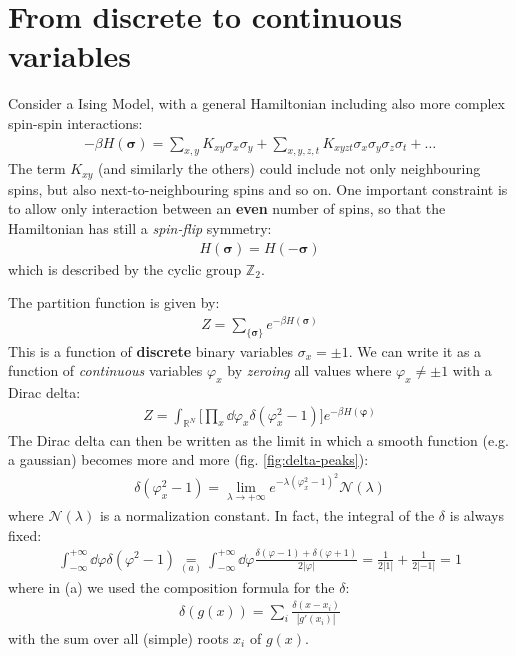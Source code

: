 \documentclass[../../main.tex]{subfiles}
\begin{document}
\section{From discrete to continuous variables}
Consider a Ising Model, with a general Hamiltonian including also more complex spin-spin interactions:
\begin{align}\label{eqn:H-complex}
    -\beta H(\bm{\sigma}) = \sum_{x,y} K_{xy} \sigma_x \sigma_y + \sum_{x,y,z,t} K_{xyzt} \sigma_x \sigma_y \sigma_z \sigma_t + \dots
\end{align}
The term $K_{xy}$ (and similarly the others) could include not only neighbouring spins, but also next-to-neighbouring spins and so on. One important constraint is to allow only interaction between an \textbf{even} number of spins, so that the Hamiltonian has still a \textit{spin-flip} symmetry:
\begin{align*}
    H(\bm{\sigma}) = H(-\bm{\sigma})
\end{align*}  
which is described by the cyclic group $\mathbb{Z}_2$.

\medskip

The partition function is given by:
\begin{align*}
    Z = \sum_{\{\bm{\sigma}\}} e^{-\beta H(\bm{\sigma})}
\end{align*}
This is a function of \textbf{discrete} binary variables $\sigma_x = \pm 1$. We can write it as a function of \textit{continuous} variables $\varphi_x$ by \textit{zeroing} all values where $\varphi_x \neq \pm 1$ with a Dirac delta:
\begin{align}\label{eqn:Z-delta}
    Z = \int_{\mathbb{R}^N} \Big[\prod_x \dd{\varphi_x} \delta(\varphi_x^2- 1)\Big] e^{-\beta H(\bm{\varphi})}
\end{align} 
The Dirac delta can then be written as the limit in which a smooth function (e.g. a gaussian) becomes more and more  (fig. \ref{fig:delta-peaks}):
\begin{align}\label{eqn:delta-limit}
    \delta(\varphi_x^2 - 1) = \lim_{\lambda \to +\infty} e^{- \lambda (\varphi_x^2 - 1)^2} \mathcal{N}(\lambda)
\end{align}
where $\mathcal{N}(\lambda)$ is a normalization constant. In fact, the integral of the $\delta$ is always fixed:
\begin{align}\label{eqn:delta-integral}
    \int_{-\infty}^{+\infty} \dd{\varphi} \delta(\varphi^2- 1) \underset{(a)}{=}  \int_{-\infty}^{+\infty} \dd{\varphi} \frac{\delta(\varphi-1) + \delta(\varphi+1)}{2|\varphi|} = \frac{1}{2|1|} + \frac{1}{2|-1|} = 1  
\end{align}
where in (a) we used the composition formula for the $\delta$:
\begin{align*}
    \delta(g(x)) = \sum_{i} \frac{\delta(x-x_i)}{|g'(x_i)|} 
\end{align*}
with the sum over all (simple) roots $x_i$ of $g(x)$.
\end{document}
